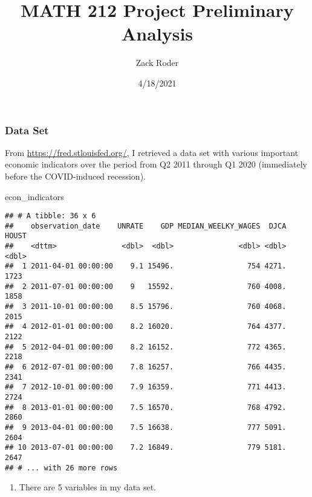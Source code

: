 \documentclass[
]{article}
\title{MATH 212 Project Preliminary Analysis}
\author{Zack Roder}
\date{4/18/2021}
\newenvironment{Shaded}{\begin{snugshade}}{\end{snugshade}}
\newcommand{\NormalTok}[1]{#1}
\providecommand{\tightlist}{%
  \setlength{\itemsep}{0pt}\setlength{\parskip}{0pt}}
\begin{document}
\maketitle

\hypertarget{data-set}{%
\subsubsection{Data Set}\label{data-set}}

From \url{https://fred.stlouisfed.org/}, I retrieved a data set with
various important economic indicators over the period from Q2 2011
through Q1 2020 (immediately before the COVID-induced recession).

\begin{Shaded}
\begin{Highlighting}[]
\NormalTok{econ\_indicators}
\end{Highlighting}
\end{Shaded}

\begin{verbatim}
## # A tibble: 36 x 6
##    observation_date    UNRATE    GDP MEDIAN_WEELKY_WAGES  DJCA HOUST
##    <dttm>               <dbl>  <dbl>               <dbl> <dbl> <dbl>
##  1 2011-04-01 00:00:00    9.1 15496.                 754 4271.  1723
##  2 2011-07-01 00:00:00    9   15592.                 760 4008.  1858
##  3 2011-10-01 00:00:00    8.5 15796.                 760 4068.  2015
##  4 2012-01-01 00:00:00    8.2 16020.                 764 4377.  2122
##  5 2012-04-01 00:00:00    8.2 16152.                 772 4365.  2218
##  6 2012-07-01 00:00:00    7.8 16257.                 766 4435.  2341
##  7 2012-10-01 00:00:00    7.9 16359.                 771 4413.  2724
##  8 2013-01-01 00:00:00    7.5 16570.                 768 4792.  2860
##  9 2013-04-01 00:00:00    7.5 16638.                 777 5091.  2604
## 10 2013-07-01 00:00:00    7.2 16849.                 779 5181.  2647
## # ... with 26 more rows
\end{verbatim}

\begin{enumerate}
\def\labelenumi{\arabic{enumi}.}
\tightlist
\item
  There are 5 variables in my data set.
\end{enumerate}
\end{document}
